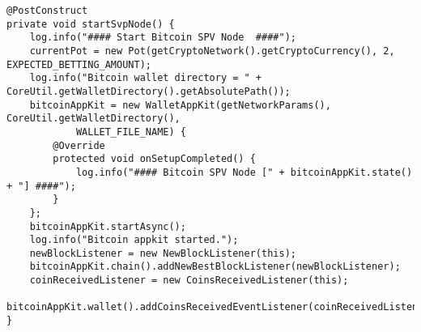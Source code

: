 \begin{lstlisting}
@PostConstruct
private void startSvpNode() {
    log.info("#### Start Bitcoin SPV Node  ####");
    currentPot = new Pot(getCryptoNetwork().getCryptoCurrency(), 2, EXPECTED_BETTING_AMOUNT);
    log.info("Bitcoin wallet directory = " + CoreUtil.getWalletDirectory().getAbsolutePath());
    bitcoinAppKit = new WalletAppKit(getNetworkParams(), CoreUtil.getWalletDirectory(),
            WALLET_FILE_NAME) {
        @Override
        protected void onSetupCompleted() {
            log.info("#### Bitcoin SPV Node [" + bitcoinAppKit.state() + "] ####");
        }
    };
    bitcoinAppKit.startAsync();
    log.info("Bitcoin appkit started.");
    newBlockListener = new NewBlockListener(this);
    bitcoinAppKit.chain().addNewBestBlockListener(newBlockListener);
    coinReceivedListener = new CoinsReceivedListener(this);
    bitcoinAppKit.wallet().addCoinsReceivedEventListener(coinReceivedListener);
}
\end{lstlisting}

